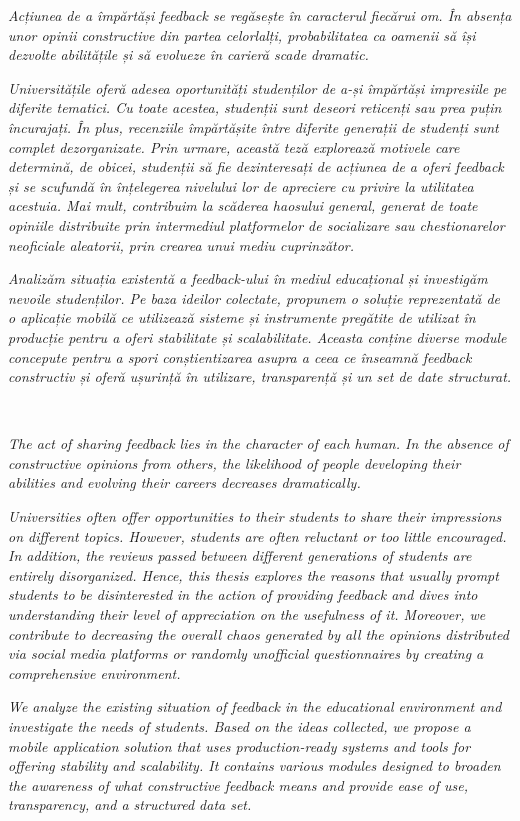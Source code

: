 \vspace*{\fill}
\noindent

\textit{Acțiunea de a împărtăși feedback se regăsește în caracterul fiecărui om. În absența unor opinii constructive din partea celorlalți, probabilitatea ca oamenii să își dezvolte abilitățile și să evolueze în carieră scade dramatic.}

\textit{Universitățile oferă adesea oportunități studenților de a-și împărtăși impresiile pe diferite tematici. Cu toate acestea, studenții sunt deseori reticenți sau prea puțin încurajați. În plus, recenziile împărtășite între diferite generații de studenți sunt complet dezorganizate. Prin urmare, această teză explorează motivele care determină, de obicei, studenții să fie dezinteresați de acțiunea de a oferi feedback și se scufundă în înțelegerea nivelului lor de apreciere cu privire la utilitatea acestuia. Mai mult, contribuim la scăderea haosului general, generat de toate opiniile distribuite prin intermediul platformelor de socializare sau chestionarelor neoficiale aleatorii, prin crearea unui mediu cuprinzător.}

\textit{Analizăm situația existentă a feedback-ului în mediul educațional și investigăm nevoile studenților. Pe baza ideilor colectate, propunem o soluție reprezentată de o aplicație mobilă ce utilizează sisteme și instrumente pregătite de utilizat în producție pentru a oferi stabilitate și scalabilitate. Aceasta conține diverse module concepute pentru a spori conștientizarea asupra a ceea ce înseamnă feedback constructiv și oferă ușurință în utilizare, transparență și un set de date structurat.}

~
\vspace*{2\baselineskip}

\textit{The act of sharing feedback lies in the character of each human. In the absence of constructive opinions from others, the likelihood of people developing their abilities and evolving their careers decreases dramatically.}

\textit{Universities often offer opportunities to their students to share their impressions on different topics. However, students are often reluctant or too little encouraged. In addition, the reviews passed between different generations of students are entirely disorganized. Hence, this thesis explores the reasons that usually prompt students to be disinterested in the action of providing feedback and dives into understanding their level of appreciation on the usefulness of it. Moreover, we contribute to decreasing the overall chaos generated by all the opinions distributed via social media platforms or randomly unofficial questionnaires by creating a comprehensive environment.}

\textit{We analyze the existing situation of feedback in the educational environment and investigate the needs of students. Based on the ideas collected, we propose a mobile application solution that uses production-ready systems and tools for offering stability and scalability. It contains various modules designed to broaden the awareness of what constructive feedback means and provide ease of use, transparency, and a structured data set.}

\vspace*{\fill}